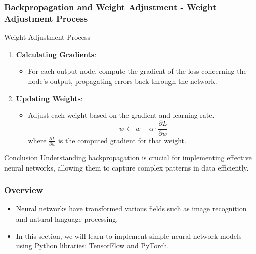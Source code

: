 \documentclass[aspectratio=169]{beamer}
\begin{document}
\begin{frame}[fragile]
    \frametitle{Backpropagation and Weight Adjustment - Weight Adjustment Process}
    \begin{block}{Weight Adjustment Process}
        \begin{enumerate}
            \item \textbf{Calculating Gradients}: 
            \begin{itemize}
                \item For each output node, compute the gradient of the loss concerning the node’s output, propagating errors back through the network.
            \end{itemize}
            \item \textbf{Updating Weights}:
            \begin{itemize}
                \item Adjust each weight based on the gradient and learning rate.
                \begin{equation}
                w \leftarrow w - \alpha \cdot \frac{\partial L}{\partial w}
                \end{equation}
                where \( \frac{\partial L}{\partial w} \) is the computed gradient for that weight.
            \end{itemize}
        \end{enumerate}
    \end{block}
    \begin{block}{Conclusion}
        Understanding backpropagation is crucial for implementing effective neural networks, allowing them to capture complex patterns in data efficiently.
    \end{block}
\end{frame}

\begin{frame}
    \titlepage
\end{frame}

\begin{frame}
    \frametitle{Overview}
    \begin{itemize}
        \item Neural networks have transformed various fields such as image recognition and natural language processing.
        \item In this section, we will learn to implement simple neural network models using Python libraries: TensorFlow and PyTorch.
    \end{itemize}
\end{frame}
\end{document}
